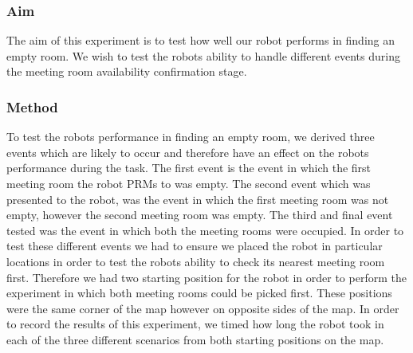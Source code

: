 \documentclass[conference]{IEEEtran}
\begin{document}
\subsubsection{Aim}
The aim of this experiment is to test how well our robot performs in finding an empty room. We wish to test the robots ability to handle different events during the meeting room availability confirmation stage.
\subsubsection{Method}
To test the robots performance in finding an empty room, we derived three events which are likely to occur and therefore have an effect on the robots performance during the task. The first event is the event in which the first meeting room the robot PRMs to was empty. The second event which was presented to the robot, was the event in which the first meeting room was not empty, however the second meeting room was empty. The third and final event tested was the event in which both the meeting rooms were occupied. In order to test these different events we had to ensure we placed the robot in particular locations in order to test the robots ability to check its nearest meeting room first. Therefore we had two starting position for the robot in order to perform the experiment in which both meeting rooms could be picked first. These positions were the same corner of the map however on opposite sides of the map. In order to record the results of this experiment, we timed how long the robot took in each of the three different scenarios from both starting positions on the map.
\end{document}
